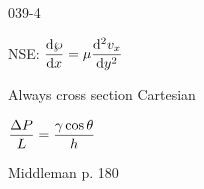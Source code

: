 \begin{mitframe}{039-4}

            
 \begin{listone}
 
 \item NSE: $\dfrac{\mathrm{d}\dynpress}{\mathrm{d}\disp}=\chempot\dfrac{\mathrm{d}^2\vvel_{\disp}}{\mathrm{d}y^2}$
 
 			\begin{listtwo}
            
            \item Always cross section Cartesian
            
            \item $\dfrac{\iipf\p}{\length}=\dfrac{\gamma\cos\theta}{\heattranscoeff}$

			\item Middleman p. 180
\end{listtwo}

\end{listone}

\end{mitframe}